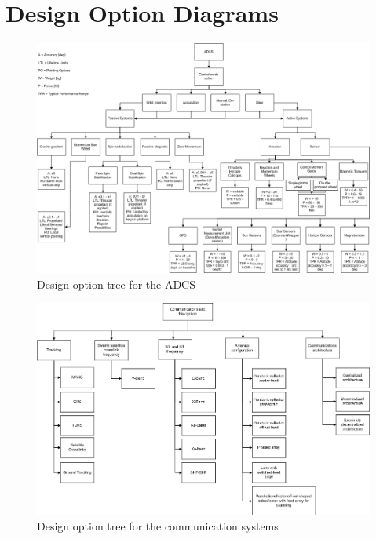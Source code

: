 \chapter{Design Option Diagrams}
\label{designOptionsDiagrams}

\begin{figure}[!ht]
\centering
\includegraphics[width=0.9\textheight, angle=90]{chapters/img/DOTadcs.png}
\caption{Design option tree for the \ac{ADCS}}
\label{pic_DOTadcs}
\end{figure}

\begin{figure} [ht!]
	\centering
	\includegraphics[width=0.9\textheight,angle=90]{chapters/img/DOTCom.jpg}	
	\caption{Design option tree for the communication systems}
	\label{fig:DOCom}
\end{figure}

